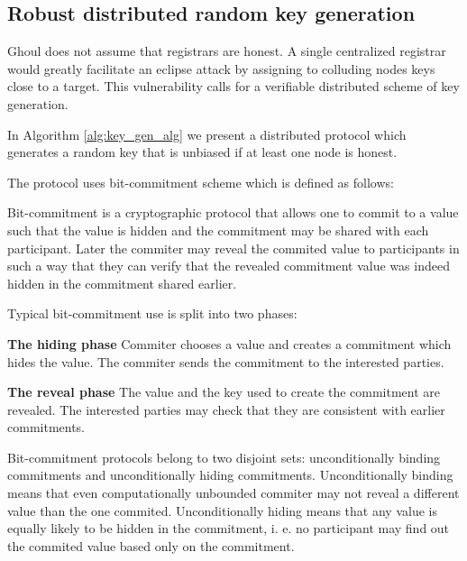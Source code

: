 \subsection{Robust distributed random key generation}

Ghoul does not assume that registrars are honest.
A single centralized registrar would greatly facilitate an eclipse attack by
assigning to colluding nodes keys close to a target.
This vulnerability  calls for a verifiable distributed scheme of key generation.

In Algorithm \ref{alg:key_gen_alg} we present a distributed protocol which
generates a random key that is unbiased if at least one node is honest.

The protocol uses bit-commitment scheme which is defined as follows:

\begin{defin*}
  Bit-commitment \cite[p.220]{gol08} is a cryptographic protocol that allows one
  to commit to a value such that the value is hidden and the commitment may be
  shared with each participant.
  Later the commiter may reveal the commited value to participants in such a way
  that they can verify that the revealed commitment value was indeed hidden in
  the commitment shared earlier.

  Typical bit-commitment use is split into two phases:
  \begin{description}
    \item{\textbf{The hiding phase}} Commiter chooses a value and creates a
      commitment which hides the value. The commiter sends the commitment to the
      interested parties.
    \item{\textbf{The reveal phase}} The value and the key used to create the
      commitment are revealed.
      The interested parties may check that they are consistent with earlier
      commitments.
  \end{description}

  Bit-commitment protocols belong to two disjoint sets: unconditionally binding
  commitments and unconditionally hiding commitments.
  Unconditionally binding means that even computationally unbounded commiter may
  not reveal a different value than the one commited. 
  Unconditionally hiding means that any value is equally likely to be hidden in
  the commitment, i. e. no participant may find out the commited value based
  only on the commitment.
\end{defin*}

